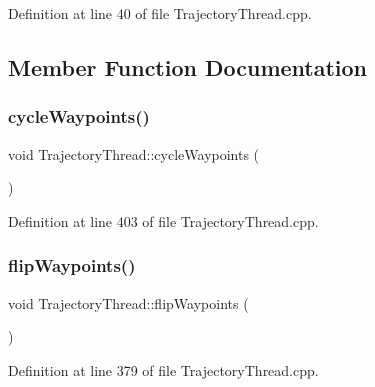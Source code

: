Definition at line 40 of file Trajectory\+Thread.\+cpp.



\subsection{Member Function Documentation}
\hypertarget{classocra__recipes_1_1TrajectoryThread_a82672124920b0707e3b530d8826ce240}{}\label{classocra__recipes_1_1TrajectoryThread_a82672124920b0707e3b530d8826ce240} 
\subsubsection{\texorpdfstring{cycle\+Waypoints()}{cycleWaypoints()}}
{\footnotesize\ttfamily void Trajectory\+Thread\+::cycle\+Waypoints (\begin{DoxyParamCaption}{ }\end{DoxyParamCaption})\hspace{0.3cm}{\ttfamily [protected]}}



Definition at line 403 of file Trajectory\+Thread.\+cpp.

\hypertarget{classocra__recipes_1_1TrajectoryThread_aa7dfe52d95ee048e1e5fbf6ed7a820bd}{}\label{classocra__recipes_1_1TrajectoryThread_aa7dfe52d95ee048e1e5fbf6ed7a820bd} 
\subsubsection{\texorpdfstring{flip\+Waypoints()}{flipWaypoints()}}
{\footnotesize\ttfamily void Trajectory\+Thread\+::flip\+Waypoints (\begin{DoxyParamCaption}{ }\end{DoxyParamCaption})\hspace{0.3cm}{\ttfamily [protected]}}



Definition at line 379 of file Trajectory\+Thread.\+cpp.

\hypertarget{classocra__recipes_1_1TrajectoryThread_ade0f6fb6c7c139dc2f09398f1464200b}{}\label{classocra__recipes_1_1TrajectoryThread_ade0f6fb6c7c139dc2f09398f1464200b} 
